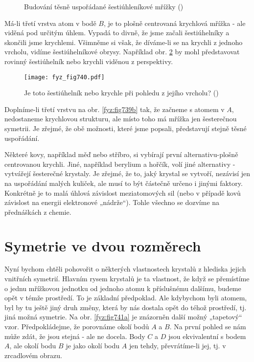     \begin{figure}[ht!]    %
      \centering
      \label{fyz:fig739}
      \caption{Budování těsně uspořádané šestiúhleníkové mřížky
               (\cite[s.~548]{Feynman02})}
    \end{figure}

    Má-li třetí vrstva atom v bodě \(B\), je to plošně centrovaná krychlová mřížka - ale viděná pod 
    určitým úhlem. Vypadá to divně, že jsme začali šestiúhelníky a skončili jsme krychlemi. 
    Všimněme si však, že díváme-li se na krychli z jednoho vrcholu, vidíme šestiúhelníkové obrysy. 
    Například obr. \ref{fyz:fig740} by mohl představovat rovinný šestiúhelník nebo krychli viděnou 
    z perspektivy.
    
    \begin{figure}[ht!] %
      \centering
      \texttt{[image: fyz\_fig740.pdf]}
      \caption{Je toto šestiúhelník nebo krychle při pohledu z jejího vrcholu?
               (\cite[s.~548]{Feynman02})}
      \label{fyz:fig740}
    \end{figure}
    
    Doplníme-li třetí vrstvu na obr. \ref{fyz:fig739b} tak, že začneme s atomem v \(A\), 
    nedostaneme krychlovou strukturu, ale místo toho má mřížka jen šesterečnou symetrii. Je zřejmé, 
    že obě možnosti, které jsme popsali, představují stejně těsné uspořádání.
    
    Některé kovy, například měď nebo stříbro, si vybírají první alternativu-plošně centrovanou 
    krychli. Jiné, například berylium a hořčík, volí jiné alternativy - vytvářejí šesterečné 
    krystaly. Je zřejmé, že to, jaký krystal se vytvoří, nezávisí jen na uspořádání malých kuliček, 
    ale musí to být částečně určeno i jinými faktory. Konkrétně je to malá úhlová závislost 
    meziatomových sil (nebo v případě kovů závislost na energii elektronové „nádrže“). Tohle 
    všechno se dozvíme na přednáškách z chemie.
    
  \section{Symetrie ve dvou rozměrech}\label{fyz:IIchapXXXsecV}
    Nyní bychom chtěli pohovořit o některých vlastnostech krystalů z hlediska jejich vnitřních 
    symetrií. Hlavním rysem krystalů je ta vlastnost, že když se přemístíme o jednu mřížkovou 
    jednotku od jednoho atomu k příslušnému dalšímu, budeme opět v témže prostředí. To je základní 
    předpoklad. Ale kdybychom byli atomem, byl by tu ještě jiný druh změny, která by nás dostala 
    opět do téhož prostředí, tj. jiná možná symetrie. Na obr. \ref{fyz:fig741a} je znázorněn další 
    možný „tapetový“ vzor. Předpokládejme, že porovnáme okolí bodů \(A\) a \(B\). Na první pohled 
    se nám může zdát, že jsou stejná - ale ne docela. Body \(C\) a \(D\) jsou ekvivalentní s bodem 
    \(A\), ale okolí bodu \(B\) je jako okolí bodu \(A\) jen tehdy, převrátíme-li jej, tj. v 
    zrcadlovém obrazu.

